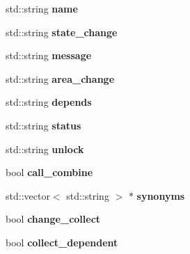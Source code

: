 \begin{DoxyCompactItemize}
\item 
\hypertarget{class_item_command_ae79c7cdf02b170b78bc5967a334cdcf7}{
std\-::string {\bfseries name}}
\label{class_item_command_ae79c7cdf02b170b78bc5967a334cdcf7}

\item 
\hypertarget{class_item_command_a7aa339b7c9c54ca6d331b9729cf8c044}{
std\-::string {\bfseries state\-\_\-change}}
\label{class_item_command_a7aa339b7c9c54ca6d331b9729cf8c044}

\item 
\hypertarget{class_item_command_a553f91c8eae8f25ba27ed0eb875e5e19}{
std\-::string {\bfseries message}}
\label{class_item_command_a553f91c8eae8f25ba27ed0eb875e5e19}

\item 
\hypertarget{class_item_command_ac5fe64207c12fbd50c3a8b92207acb40}{
std\-::string {\bfseries area\-\_\-change}}
\label{class_item_command_ac5fe64207c12fbd50c3a8b92207acb40}

\item 
\hypertarget{class_item_command_a6da1ba48131d1f2c414ad4728e7bb4c2}{
std\-::string {\bfseries depends}}
\label{class_item_command_a6da1ba48131d1f2c414ad4728e7bb4c2}

\item 
\hypertarget{class_item_command_a46091780df5b87f52db4e851deeb2aa1}{
std\-::string {\bfseries status}}
\label{class_item_command_a46091780df5b87f52db4e851deeb2aa1}

\item 
\hypertarget{class_item_command_ab48cc2be6ad392f61a4cc09d8ddaa061}{
std\-::string {\bfseries unlock}}
\label{class_item_command_ab48cc2be6ad392f61a4cc09d8ddaa061}

\item 
\hypertarget{class_item_command_a980a5aea68b7ace0a401561f81fc484e}{
bool {\bfseries call\-\_\-combine}}
\label{class_item_command_a980a5aea68b7ace0a401561f81fc484e}

\item 
\hypertarget{class_item_command_adc9ff7f20c2dec3f40bf5856d508cde2}{
std\-::vector$<$ std\-::string $>$ $\ast$ {\bfseries synonyms}}
\label{class_item_command_adc9ff7f20c2dec3f40bf5856d508cde2}

\item 
\hypertarget{class_item_command_a624650b662bbb506c74f943f40c9d9ea}{
bool {\bfseries change\-\_\-collect}}
\label{class_item_command_a624650b662bbb506c74f943f40c9d9ea}

\item 
\hypertarget{class_item_command_a6d69129934e185fbe2e8be0db40b0f94}{
bool {\bfseries collect\-\_\-dependent}}
\label{class_item_command_a6d69129934e185fbe2e8be0db40b0f94}

\end{DoxyCompactItemize}


